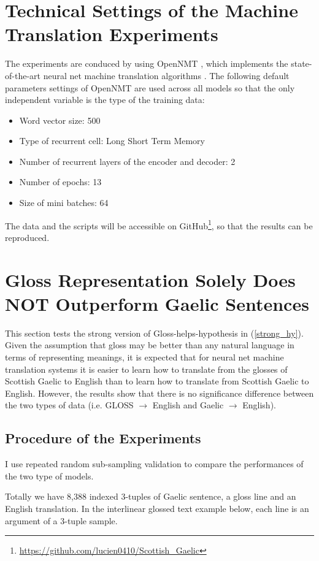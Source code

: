 \documentclass[a4paper]{article}
\begin{document}
\section{Technical Settings of the Machine Translation Experiments}\label{sec:experimet_setting}
The experiments are conduced by using OpenNMT \citep{2017opennmt}, which implements the state-of-the-art neural net machine translation algorithms \citep{cho2014properties, cho2014learning, bahdanau2014neural}. 
The following default parameters settings of OpenNMT are used across all models so that the only independent variable is the type of the training data: 
\begin{itemize}
\item Word vector size: 500
\item Type of recurrent cell: Long Short Term Memory
\item Number of recurrent layers of the encoder and decoder: 2
\item Number of epochs: 13 
\item Size of mini batches: 64 
\end{itemize}
The data and the scripts will be accessible on GitHub\footnote{\url{https://github.com/lucien0410/Scottish_Gaelic}}, so that the results can be reproduced.   

\section{Gloss Representation Solely Does NOT Outperform Gaelic Sentences} \label{gd_to_gl_to_en}
This section tests the strong version of Gloss-helps-hypothesis in (\ref{strong_hy}).
Given the assumption that gloss may be better than any natural language in terms of representing meanings, it is expected that for neural net machine translation systems it is easier to learn how to translate from the glosses of Scottish Gaelic to English than to learn how to translate from Scottish Gaelic to English. However, the results show that there is no significance difference between the two types of data (i.e. GLOSS $\rightarrow$ English and Gaelic $\rightarrow$ English). 

\subsection{Procedure of the Experiments}
I use repeated random sub-sampling validation to compare the performances of the two type of models.

Totally we have 8,388 indexed 3-tuples of Gaelic sentence, a gloss line and an English translation. In the interlinear glossed text example below, each line is an argument of a 3-tuple sample. 
\end{document}
